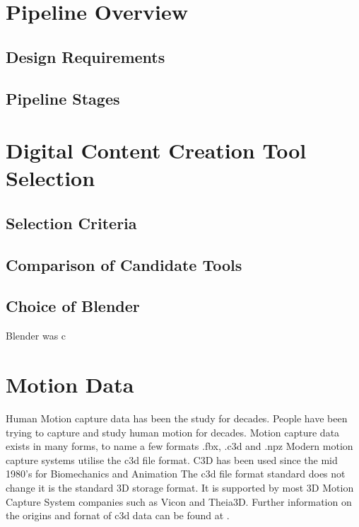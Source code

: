 \label{chap:pipeline}

\section{Pipeline Overview}
\label{sec:pipelineoverview}

\subsection{Design Requirements}

\subsection{Pipeline Stages}

\section{Digital Content Creation Tool Selection}
\label{sec:dccselection}

\subsection{Selection Criteria}

\subsection{Comparison of Candidate Tools}


\subsection{Choice of Blender}

Blender was c

\section{Motion Data}
\label{sec:motiondata}

Human Motion capture data has been the study for decades. People have been trying to capture and study human motion for decades.
Motion capture data exists in many forms, to name a few formats .fbx, .c3d and .npz
Modern motion capture systems utilise the c3d file format. C3D has been used since the mid 1980's for Biomechanics and Animation
The c3d file format standard does not change it is the standard 3D storage format. It is supported by most 3D Motion Capture System companies such as Vicon and Theia3D.
Further information on the origins and fornat of c3d data can be found at \cite{cramp2023standard}.



